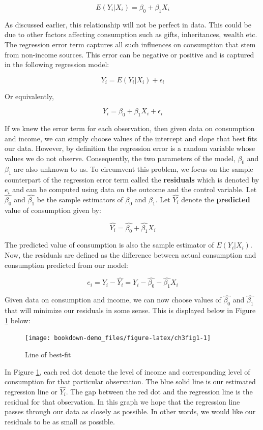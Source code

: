 \documentclass[
]{book}
\theoremstyle{definition}
\theoremstyle{definition}
\theoremstyle{definition}
\theoremstyle{definition}
\theoremstyle{remark}
\begin{document}
\[E(Y_i|X_i)=\beta_0 +\beta_1 X_i\]

As discussed earlier, this relationship will not be perfect in data. This could be due to other factors affecting consumption such as gifts, inheritances, wealth etc. The regression error term captures all such influences on consumption that stem from non-income sources. This error can be negative or positive and is captured in the following regression model:

\[Y_i=E(Y_i|X_i)+\epsilon_i \]

Or equivalently,

\[Y_i=\beta_0 + \beta_1 X_i + \epsilon_i\]

If we knew the error term for each observation, then given data on consumption and income, we can simply choose values of the intercept and slope that best fits our data. However, by definition the regression error is a random variable whose values we do not observe. Consequently, the two parameters of the model, \(\beta_0\) and \(\beta_1\) are also unknown to us. To circumvent this problem, we focus on the sample counterpart of the regression error term called the \textbf{residuals} which is denoted by \(e_i\) and can be computed using data on the outcome and the control variable. Let \(\hat{\beta_0}\) and \(\hat{\beta_1}\) be the sample estimators of \(\beta_0\) and \(\beta_1\). Let \(\hat{Y_i}\) denote the \textbf{predicted} value of consumption given by:

\[\hat{Y_i}=\hat{\beta_0} + \hat{\beta_1} X_i \]

The predicted value of consumption is also the sample estimator of \(E(Y_i|X_i)\). Now, the residuals are defined as the difference between actual consumption and consumption predicted from our model:

\[e_i=Y_i -\hat{Y_i}= Y_i- \hat{\beta_0} - \hat{\beta_1} X_i\]

Given data on consumption and income, we can now choose values of \(\hat{\beta_0}\) and \(\hat{\beta_1}\) that will minimize our residuals in some sense. This is displayed below in Figure \ref{fig:ch3fig1} below:

\begin{figure}

{\centering \texttt{[image: bookdown-demo\_files/figure-latex/ch3fig1-1]} 

}

\caption{Line of best-fit}\label{fig:ch3fig1}
\end{figure}

In Figure \ref{fig:ch3fig1}, each red dot denote the level of income and corresponding level of consumption for that particular observation. The blue solid line is our estimated regression line or \(\hat{Y_i}\). The gap between the red dot and the regression line is the residual for that observation. In this graph we hope that the regression line passes through our data as closely as possible. In other words, we would like our residuals to be as small as possible.
\end{document}
